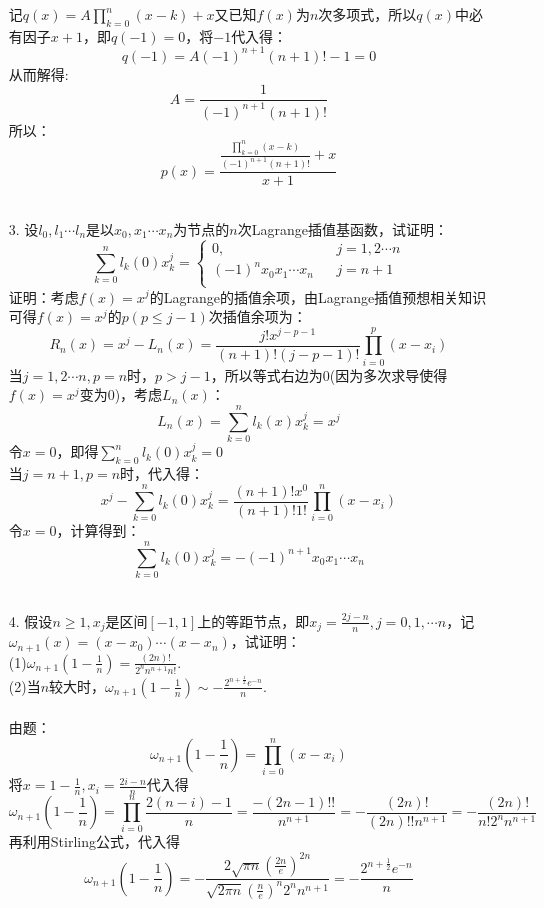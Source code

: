 \documentclass{article}
\begin{document}
\begin{itemize}
		记$q(x) = A\prod_{k=0}^{n}(x-k)+ x$又已知$f(x)$为$n$次多项式，所以$q(x)$中必有因子$x+1$，即$q(-1) = 0$，将$-1$代入得：
		\[q(-1) = A(-1)^{n+1}(n+1)! - 1 = 0\]
		从而解得:
		\[A = \frac{1}{(-1)^{n+1}(n+1)!}\]
		所以：
		\[p(x) = \frac{\frac{\prod_{k=0}^{n}(x-k)}{(-1)^{n+1}(n+1)!} + x}{x+1}\]\\
		\item[3.]设$l_{0},l_{1}\cdots l_{n}$是以$x_{0},x_{1}\cdots x_{n}$为节点的$n$次Lagrange插值基函数，试证明：
		$$ \sum_{k=0}^{n}l_{k}(0)x_{k}^{j}=\left\{
		\begin{array}{rcl}
		0,       &      & {j = 1, 2 \cdots n}\\
		(-1)^{n}x_{0}x_{1}\cdots x_{n}     &      & {j = n+1}\\
		\end{array} \right. $$
		证明：考虑$f(x)=x^{j}$的Lagrange的插值余项，由Lagrange插值预想相关知识可得$f(x) = x^{j}$的$p(p \le j - 1)$次插值余项为：
		\[R_{n}(x) = x^{j} - L_{n}(x)=\frac{j!x^{j - p - 1}}{(n+1)!(j - p - 1)!}\prod_{i = 0}^{p}(x - x_{i})\]
		当$j = 1, 2\cdots n, p = n$时，$p > j - 1$，所以等式右边为$0$(因为多次求导使得$f(x) = x^{j}$变为$0$)，考虑$L_{n}(x)$：
		\[L_{n}(x) = \sum_{k=0}^{n}l_{k}(x)x_{k}^{j} = x^{j}\]
		令$x = 0$，即得$\sum_{k=0}^{n}l_{k}(0)x_{k}^{j} = 0$\\
		当$j = n+1,p =n$时，代入得：
		\[x^{j} - \sum_{k=0}^{n}l_{k}(0)x_{k}^{j} = \frac{(n+1)!x^{0}}{(n+1)!1!}\prod_{i = 0}^{n}(x - x_{i})\]
		令$x = 0$，计算得到：
		\[\sum_{k=0}^{n}l_{k}(0)x_{k}^{j} = -(-1)^{n+1}x_{0}x_{1}\cdots x_{n}\]\\
		\item[4.]假设$n\ge 1,x_{j}$是区间$[-1,1]$上的等距节点，即$x_{j}=\frac{2j -n}{n},j = 0,1,\cdots n$，记$\omega_{n+1}(x) = (x - x_{0})\cdots (x - x_{n})$，试证明：\\
		(1)$\omega_{n+1}(1 - \frac{1}{n}) = \frac{(2n)!}{2^{n}n^{n+1}n!}$.\\
		(2)当$n$较大时，$\omega_{n+1}(1 - \frac{1}{n}) \sim -\frac{2^{n + \frac{1}{2}}e^{-n}}{n}$.\\\\
		由题：
		\[\omega_{n+1}(1 - \frac{1}{n}) = \prod_{i = 0}^{n}(x - x_{i})\]
		将$x = 1-\frac{1}{n},x_{i} =\frac{2i - n}{n}$代入得
		\[\omega_{n+1}(1 - \frac{1}{n}) = \prod_{i = 0}^{n}\frac{2(n-i) - 1}{n} = \frac{-(2n - 1)!!}{n^{n + 1}} = -\frac{(2n)!}{(2n)!!n^{n+1}} =-\frac{(2n)!}{n!2^{n}n^{n+1}}\]
		再利用Stirling公式，代入得
		\[\omega_{n+1}(1 - \frac{1}{n}) = -\frac{2\sqrt{\pi n}(\frac{2n}{e})^{2n}}{\sqrt{2 \pi n}(\frac{n}{e})^n 2^{n} n^{n+1}} = -\frac{2^{n + \frac{1}{2}}e^{-n}}{n}\]\\\\

\end{itemize}
\end{document}
